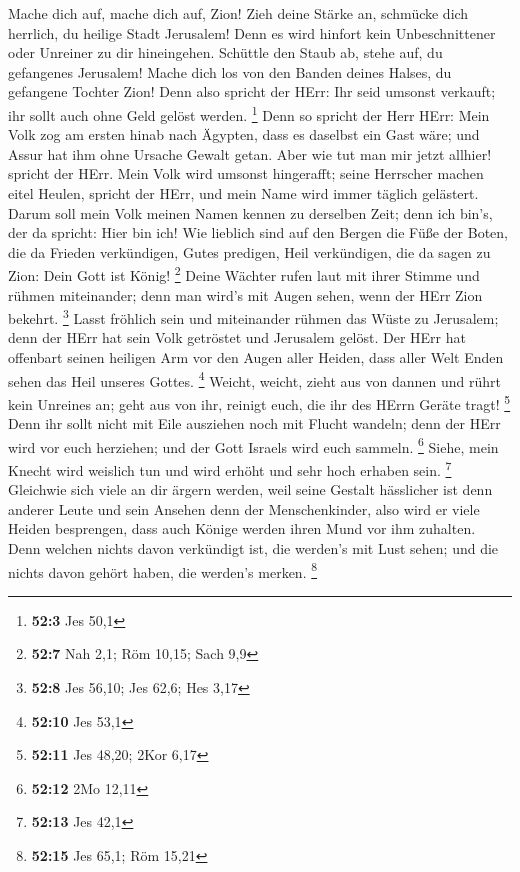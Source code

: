  Mache dich auf, mache dich auf, Zion! Zieh deine Stärke an,
schmücke dich herrlich, du heilige Stadt Jerusalem! Denn es wird hinfort
kein Unbeschnittener oder Unreiner zu dir hineingehen. 
Schüttle den Staub ab, stehe auf, du gefangenes Jerusalem! Mache dich
los von den Banden deines Halses, du gefangene Tochter Zion!
 Denn also spricht der HErr: Ihr seid umsonst verkauft; ihr
sollt auch ohne Geld gelöst werden. \footnote{\textbf{52:3} Jes 50,1}
 Denn so spricht der Herr HErr: Mein Volk zog am ersten
hinab nach Ägypten, dass es daselbst ein Gast wäre; und Assur hat ihm
ohne Ursache Gewalt getan.  Aber wie tut man mir jetzt
allhier! spricht der HErr. Mein Volk wird umsonst hingerafft; seine
Herrscher machen eitel Heulen, spricht der HErr, und mein Name wird
immer täglich gelästert.  Darum soll mein Volk meinen Namen
kennen zu derselben Zeit; denn ich bin's, der da spricht: Hier bin ich!
 Wie lieblich sind auf den Bergen die Füße der Boten, die da
Frieden verkündigen, Gutes predigen, Heil verkündigen, die da sagen zu
Zion: Dein Gott ist König! \footnote{\textbf{52:7} Nah 2,1; Röm 10,15;
  Sach 9,9}  Deine Wächter rufen laut mit ihrer Stimme und
rühmen miteinander; denn man wird's mit Augen sehen, wenn der HErr Zion
bekehrt. \footnote{\textbf{52:8} Jes 56,10; Jes 62,6; Hes 3,17}
 Lasst fröhlich sein und miteinander rühmen das Wüste zu
Jerusalem; denn der HErr hat sein Volk getröstet und Jerusalem gelöst.
 Der HErr hat offenbart seinen heiligen Arm vor den Augen
aller Heiden, dass aller Welt Enden sehen das Heil unseres Gottes.
\footnote{\textbf{52:10} Jes 53,1}  Weicht, weicht, zieht
aus von dannen und rührt kein Unreines an; geht aus von ihr, reinigt
euch, die ihr des HErrn Geräte tragt! \footnote{\textbf{52:11} Jes
  48,20; 2Kor 6,17}  Denn ihr sollt nicht mit Eile
ausziehen noch mit Flucht wandeln; denn der HErr wird vor euch
herziehen; und der Gott Israels wird euch sammeln. \footnote{\textbf{52:12}
  2Mo 12,11}  Siehe, mein Knecht wird weislich tun und wird
erhöht und sehr hoch erhaben sein. \footnote{\textbf{52:13} Jes 42,1}
 Gleichwie sich viele an dir ärgern werden, weil seine
Gestalt hässlicher ist denn anderer Leute und sein Ansehen denn der
Menschenkinder,  also wird er viele Heiden besprengen, dass
auch Könige werden ihren Mund vor ihm zuhalten. Denn welchen nichts
davon verkündigt ist, die werden's mit Lust sehen; und die nichts davon
gehört haben, die werden's merken. \footnote{\textbf{52:15} Jes 65,1;
  Röm 15,21}


